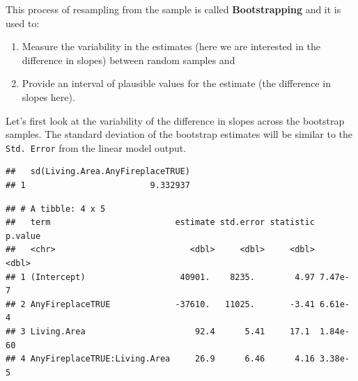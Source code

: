 \documentclass[
]{book}
\newenvironment{Shaded}{\begin{snugshade}}{\end{snugshade}}
\newcommand{\CommentTok}[1]{\textcolor[rgb]{0.56,0.35,0.01}{\textit{#1}}}
\newcommand{\KeywordTok}[1]{\textcolor[rgb]{0.13,0.29,0.53}{\textbf{#1}}}
\newcommand{\NormalTok}[1]{#1}
\newcommand{\OperatorTok}[1]{\textcolor[rgb]{0.81,0.36,0.00}{\textbf{#1}}}
\newcommand{\StringTok}[1]{\textcolor[rgb]{0.31,0.60,0.02}{#1}}
\providecommand{\tightlist}{%
  \setlength{\itemsep}{0pt}\setlength{\parskip}{0pt}}
\begin{document}
This process of resampling from the sample is called \textbf{Bootstrapping} and it is used to:

\begin{enumerate}
\def\labelenumi{\arabic{enumi}.}
\tightlist
\item
  Measure the variability in the estimates (here we are interested in the difference in slopes) between random samples and
\item
  Provide an interval of plausible values for the estimate (the difference in slopes here).
\end{enumerate}

Let's first look at the variability of the difference in slopes across the bootstrap samples. The standard deviation of the bootstrap estimates will be similar to the \texttt{Std.\ Error} from the linear model output.

\begin{Shaded}
\end{Shaded}

\begin{verbatim}
##   sd(Living.Area.AnyFireplaceTRUE)
## 1                         9.332937
\end{verbatim}

\begin{Shaded}
\end{Shaded}

\begin{verbatim}
## # A tibble: 4 x 5
##   term                         estimate std.error statistic  p.value
##   <chr>                           <dbl>     <dbl>     <dbl>    <dbl>
## 1 (Intercept)                   40901.    8235.        4.97 7.47e- 7
## 2 AnyFireplaceTRUE             -37610.   11025.       -3.41 6.61e- 4
## 3 Living.Area                      92.4      5.41     17.1  1.84e-60
## 4 AnyFireplaceTRUE:Living.Area     26.9      6.46      4.16 3.38e- 5
\end{verbatim}
\end{document}
